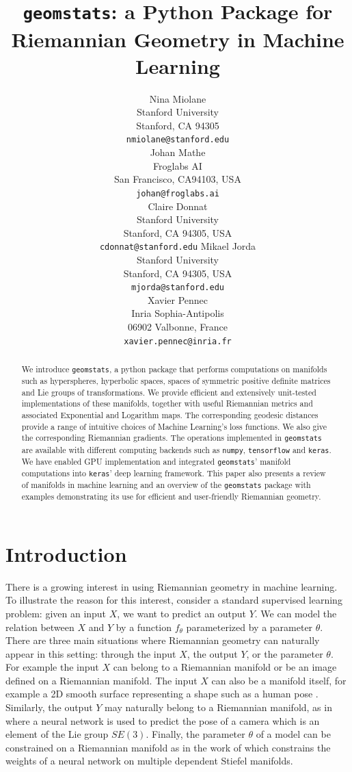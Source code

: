 \documentclass{article}
\title{\texttt{geomstats}: a Python Package for Riemannian Geometry in Machine Learning}
\author{
Nina Miolane \\
  Stanford University\\
  Stanford, CA 94305 \\
  \texttt{nmiolane@stanford.edu} \\
  \And
  Johan Mathe \\
  Froglabs AI\\
  San Francisco, CA94103, USA\\
  \texttt{johan@froglabs.ai} \\
  \And
   Claire	Donnat \\
    Stanford University			 \\
    Stanford, CA 94305, USA \\	
  \texttt{cdonnat@stanford.edu}
    \And
    Mikael	Jorda	\\
    Stanford University			 \\
    Stanford, CA 94305, USA \\		
    \texttt{mjorda@stanford.edu} \\
    \And
    Xavier Pennec \\
    Inria Sophia-Antipolis \\
    06902 Valbonne, France \\
    \texttt{xavier.pennec@inria.fr}
}
\begin{document}

\maketitle


\begin{abstract}
We introduce \texttt{geomstats}, a python package that performs computations on manifolds such as hyperspheres, hyperbolic spaces, spaces of symmetric positive definite matrices and Lie groups of transformations. We provide efficient and extensively unit-tested implementations of these manifolds, together with useful Riemannian metrics and associated Exponential and Logarithm maps. The corresponding geodesic distances provide a range of intuitive choices of Machine Learning's loss functions. We also give the corresponding Riemannian gradients. The operations implemented in \texttt{geomstats} are available with different computing backends such as \texttt{numpy}, \texttt{tensorflow} and  \texttt{keras}. We have enabled GPU implementation and integrated \texttt{geomstats}' manifold computations into  \texttt{keras}' deep learning framework. This paper also presents a review of manifolds in machine learning and an overview of the \texttt{geomstats} package with examples demonstrating its use for efficient and user-friendly Riemannian geometry.
\end{abstract}




\section{Introduction}

There is a growing interest in using Riemannian geometry in machine learning. To illustrate the reason for this interest, consider a standard supervised learning problem: given an input $X$, we want to predict an output $Y$. We can model the relation between $X$ and $Y$ by a function $f_\theta$ parameterized by a parameter $\theta$. There are three main situations where Riemannian geometry can naturally appear in this setting: through the input $X$, the output $Y$, or the parameter $\theta$. For example the input $X$ can belong to a Riemannian manifold or be an image defined on a Riemannian manifold. The input $X$ can also be a manifold itself, for example a 2D smooth surface representing a shape such as a human pose \cite{Bronstein2017}. Similarly, the output $Y$ may naturally belong to a Riemannian manifold, as in \cite{Hou2018} where a neural network is used to predict the pose of a camera which is an element of the Lie group $SE(3)$. Finally, the parameter $\theta$ of a model can be constrained on a Riemannian manifold as in the work of \cite{Huang2017} which constrains the weights of a neural network on multiple dependent Stiefel manifolds. 
\end{document}
